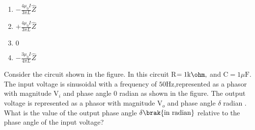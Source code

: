 \begin{figure}[H]
\centering
{}%

\end{figure}
\begin{multicols}{4}
    \begin{enumerate}
        \item $- \frac{4 \mu_0 I}{3 \pi L}\hat{Z}$
        \item $+ \frac{4 \mu_0 I}{3 \pi L}\hat{Z}$
        \item $0$
        \item $- \frac{3 \mu_0 I}{4 \pi L}\hat{Z}$
    \end{enumerate}
\end{multicols}
\bigskip
\item Consider the circuit shown in the figure. In this circuit R$=1 \text{k}\ohm,$ and C$=1 \mu \text{F}.$ The input voltage is sinusoidal with a frequency of $50$Hz,represented as a phasor with magnitude V$_{i}$ and phase angle $0$  radian as shown in the figure. The output voltage is represented as a phasor with magnitude V$_{o}$ and  phase angle $\delta$ radian . What is the value of the output phase angle $\delta\brak{\text{in radian}}$ relative to the phase
angle of the input voltage?
